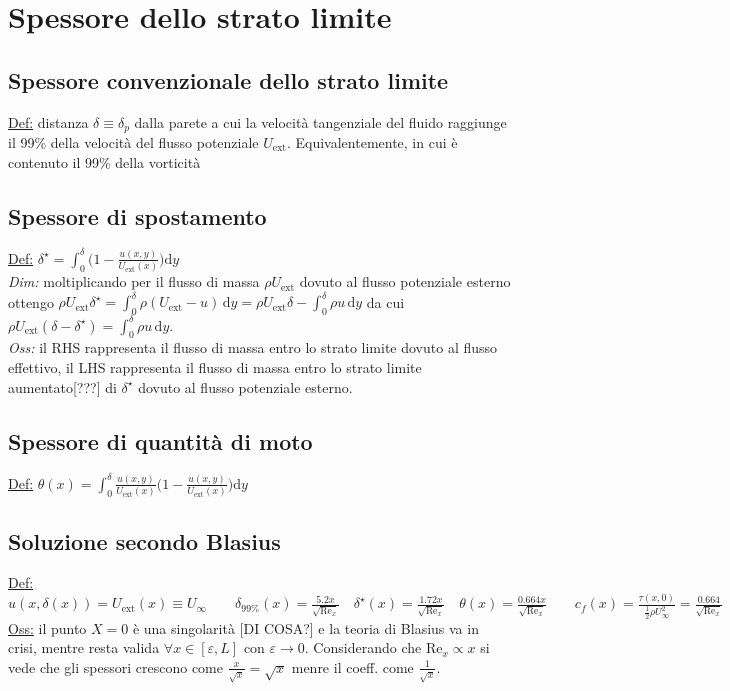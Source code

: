 \documentclass[11pt,a4paper]{report}
\newcommand{\de}{\mathrm d}
\begin{document}
{	\section{Spessore dello strato limite}
		\subsection{Spessore convenzionale dello strato limite}
		\underline{Def:} distanza $\delta\equiv\delta_p$ dalla parete a cui la velocità tangenziale del fluido raggiunge il 99\% della velocità del flusso potenziale $U_\mathrm{ext}$. Equivalentemente, in cui è contenuto il 99\% della vorticità
		\subsection{Spessore di spostamento}
		\underline{Def:} $\delta^\star=\int_0^\delta\big(1-\frac{u(x,y)}{U_\mathrm{ext}(x)}\big)\de y$\\
		\textit{Dim:} moltiplicando per il flusso di massa $\rho U_\mathrm{ext}$ dovuto al flusso potenziale esterno ottengo $\rho U_\mathrm{ext}\delta^\star=\int_0^\delta\rho(U_\mathrm{ext}-u)\,\de y=\rho U_\mathrm{ext}\delta-\int_0^\delta\rho u\,\de y$ da cui $\rho U_\mathrm{ext}(\delta-\delta^\star)=\int_0^\delta\rho u\,\de y$.\\
		\textit{Oss:} il RHS rappresenta il flusso di massa entro lo strato limite dovuto al flusso effettivo, il LHS rappresenta il flusso di massa entro lo strato limite aumentato[???] di $\delta^\star$ dovuto al flusso potenziale esterno.
		\subsection{Spessore di quantità di moto}
		\underline{Def:} $\theta(x)=\int_0^\delta\frac{u(x,y)}{U_\mathrm{ext}(x)}\big(1-\frac{u(x,y)}{U_\mathrm{ext}(x)}\big)\de y$
		\subsection{Soluzione secondo Blasius}
		\underline{Def:} $u(x,\delta(x))=U_\mathrm{ext}(x)\equiv U_\infty\qquad \delta_{99\%}(x)=\frac{5.2x}{\sqrt{\mathrm{Re}_x}}\quad \delta^\star(x)=\frac{1.72x}{\sqrt{\mathrm{Re}_x}}\quad\theta(x)=\frac{0.664x}{\sqrt{\mathrm{Re}_x}}\qquad c_f(x)=\frac{\tau(x,0)}{\frac 12\rho U_\infty^2}=\frac{0.664}{\sqrt{\mathrm{Re}_x}}$\\
		\underline{Oss:} il punto $X=0$ è una singolarità [DI COSA?] e la teoria di Blasius va in crisi, mentre resta valida $\forall x\in [\varepsilon,L]$ con $\varepsilon\to 0$.
		Considerando che $\mathrm{Re}_x\propto x$ si vede che gli spessori crescono come $\frac{x}{\sqrt x}=\sqrt x$ menre il coeff. come $\frac 1{\sqrt x}$.
}
\end{document}
